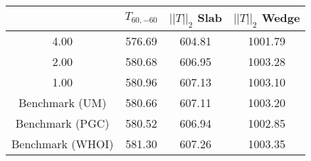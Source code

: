 \begin{tabular}{c|ccc}
    & $T_{60,-60}$ & $||T||_2$ Slab & $||T||_2$ Wedge \\
\hline
4.00 & 576.69 & 604.81 & 1001.79 \\
2.00 & 580.68 & 606.95 & 1003.28 \\
1.00 & 580.96 & 607.13 & 1003.10 \\
\hline
Benchmark (UM) & 580.66 & 607.11 & 1003.20 \\
Benchmark (PGC) & 580.52 & 606.94 & 1002.85 \\
Benchmark (WHOI) & 581.30 & 607.26 & 1003.35 \\
\end{tabular}
